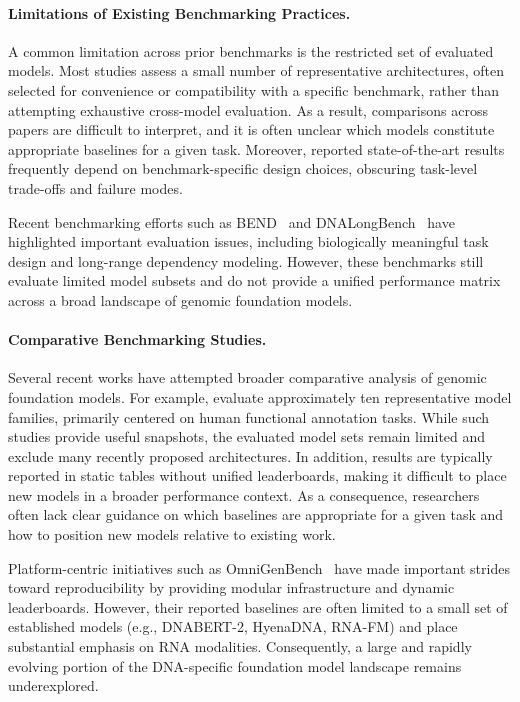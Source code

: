 \documentclass{llmxive}
\begin{document}
\paragraph{Limitations of Existing Benchmarking Practices.}
A common limitation across prior benchmarks is the restricted set of evaluated models. Most studies assess a small number of representative architectures, often selected for convenience or compatibility with a specific benchmark, rather than attempting exhaustive cross-model evaluation. As a result, comparisons across papers are difficult to interpret, and it is often unclear which models constitute appropriate baselines for a given task. Moreover, reported state-of-the-art results frequently depend on benchmark-specific design choices, obscuring task-level trade-offs and failure modes.

Recent benchmarking efforts such as BEND~\citep{marin2024bendbenchmarkingdnalanguage} and DNALongBench~\citep{Cheng2025.01.06.631595} have highlighted important evaluation issues, including biologically meaningful task design and long-range dependency modeling. However, these benchmarks still evaluate limited model subsets and do not provide a unified performance matrix across a broad landscape of genomic foundation models.

\paragraph{Comparative Benchmarking Studies.}
Several recent works have attempted broader comparative analysis of genomic foundation models. For example, \citet{wang2025genomic} evaluate approximately ten representative model families, primarily centered on human functional annotation tasks. While such studies provide useful snapshots, the evaluated model sets remain limited and exclude many recently proposed architectures. In addition, results are typically reported in static tables without unified leaderboards, making it difficult to place new models in a broader performance context. As a consequence, researchers often lack clear guidance on which baselines are appropriate for a given task and how to position new models relative to existing work.

Platform-centric initiatives such as OmniGenBench~\citep{wang2025omnigenbenchbenchmarkomnipotentmultimodal} have made important strides toward reproducibility by providing modular infrastructure and dynamic leaderboards. However, their reported baselines are often limited to a small set of established models (e.g., DNABERT-2, HyenaDNA, RNA-FM) and place substantial emphasis on RNA modalities. Consequently, a large and rapidly evolving portion of the DNA-specific foundation model landscape remains underexplored.
\end{document}
